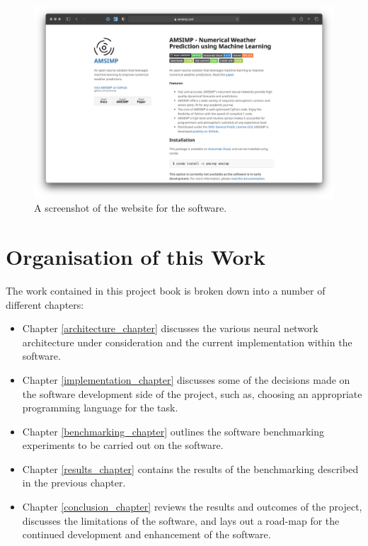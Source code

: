 \begin{figure}[H]
    \centering
    \includegraphics[width=.75\linewidth]{Images/website}
    \caption{A screenshot of the website for the software.}
    \label{website}
\end{figure}

\section{Organisation of this Work}
The work contained in this project book is broken down into a number of different chapters:

\begin{itemize}
    \item Chapter \ref{architecture_chapter} discusses the various neural network architecture under consideration and the current implementation within the software.
    \item Chapter \ref{implementation_chapter} discusses some of the decisions made on the software development side of the project, such as, choosing an appropriate programming language for the task. 
    \item Chapter \ref{benchmarking_chapter} outlines the software benchmarking experiments to be carried out on the software.
    \item Chapter \ref{results_chapter} contains the results of the benchmarking described in the previous chapter.
    \item Chapter \ref{conclusion_chapter} reviews the results and outcomes of the project, discusses the limitations of the software, and lays out a road-map for the continued development and enhancement of the software. 
\end{itemize}
